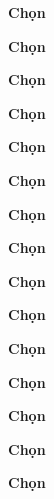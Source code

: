\begin{loigiaiex}{44}
  \phantom {a}\hfill {\bfseries \sffamily Chọn~} 
\end{loigiaiex}
\begin{loigiaiex}{45}
  \phantom {a}\hfill {\bfseries \sffamily Chọn~} 
\end{loigiaiex}
\begin{loigiaiex}{46}
  \phantom {a}\hfill {\bfseries \sffamily Chọn~} 
\end{loigiaiex}
\begin{loigiaiex}{47}
  \phantom {a}\hfill {\bfseries \sffamily Chọn~} 
\end{loigiaiex}
\begin{loigiaiex}{48}
  \phantom {a}\hfill {\bfseries \sffamily Chọn~} 
\end{loigiaiex}
\begin{loigiaiex}{49}
  \phantom {a}\hfill {\bfseries \sffamily Chọn~} 
\end{loigiaiex}
\begin{loigiaiex}{50}
  \phantom {a}\hfill {\bfseries \sffamily Chọn~} 
\end{loigiaiex}
\begin{loigiaiex}{51}
  \phantom {a}\hfill {\bfseries \sffamily Chọn~} 
\end{loigiaiex}
\begin{loigiaiex}{52}
  \phantom {a}\hfill {\bfseries \sffamily Chọn~} 
\end{loigiaiex}
\begin{loigiaiex}{53}
  \phantom {a}\hfill {\bfseries \sffamily Chọn~} 
\end{loigiaiex}
\begin{loigiaiex}{54}
  \phantom {a}\hfill {\bfseries \sffamily Chọn~} 
\end{loigiaiex}
\begin{loigiaiex}{55}
  \phantom {a}\hfill {\bfseries \sffamily Chọn~} 
\end{loigiaiex}
\begin{loigiaiex}{56}
  \phantom {a}\hfill {\bfseries \sffamily Chọn~} 
\end{loigiaiex}
\begin{loigiaiex}{57}
  \phantom {a}\hfill {\bfseries \sffamily Chọn~} 
\end{loigiaiex}
\begin{loigiaiex}{58}
  \phantom {a}\hfill {\bfseries \sffamily Chọn~} 
\end{loigiaiex}

